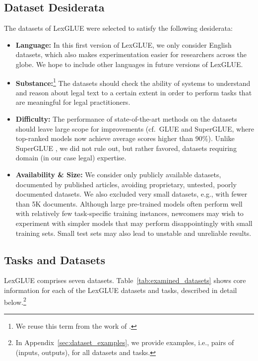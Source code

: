\documentclass[11pt]{article}
\begin{document}
\subsection{Dataset Desiderata} 
\label{sec:desiderata}
The datasets of LexGLUE were selected to satisfy the following desiderata: 
\begin{itemize}[leftmargin=8pt]
    \item \textbf{Language:} In this first version of LexGLUE, we only consider English datasets, which also makes experimentation easier for researchers across the globe. We hope to include other languages in future versions of LexGLUE. 


    \item \textbf{Substance:}\footnote{We reuse this term from the work of \citet{wang-2019-superglue}.} The datasets should check the ability of systems to understand and reason about 
    legal text to a certain extent in order to perform tasks that are meaningful for legal practitioners. 

    \item \textbf{Difficulty:} The performance of state-of-the-art methods on the datasets should leave large scope for improvements (cf.\ GLUE and SuperGLUE, where top-ranked models now achieve average scores higher than 90\%). Unlike SuperGLUE \cite{wang-2019-superglue}, we did not rule out, but rather favored, datasets requiring domain (in our case legal) expertise. 

    \item \textbf{Availability \& Size:} We consider only publicly available datasets, documented by published articles, avoiding proprietary, untested, poorly documented datasets.  We also excluded very small datasets, e.g., with fewer than 5K documents. Although large pre-trained models often perform well with relatively few task-specific training instances, newcomers may wish to experiment with simpler models that may perform disappointingly with small training sets. Small test sets may also lead to unstable and unreliable results.
\end{itemize}
\vspace{-2mm}


\subsection{Tasks and Datasets}
\label{sec:tasks}
LexGLUE comprises seven datasets. Table~\ref{tab:examined_datasets} shows core information for each of the LexGLUE datasets and tasks, described in detail below.\footnote{In Appendix~\ref{sec:dataset_examples}, we provide examples, i.e., pairs of (inputs, outputs), for all datasets and tasks.}
\end{document}
